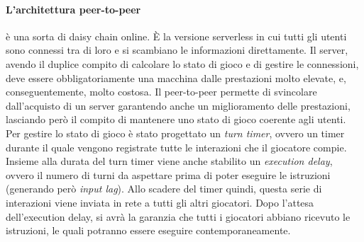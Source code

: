        \paragraph{L'architettura peer-to-peer} è una sorta di daisy chain online. È la versione serverless in cui tutti gli utenti sono connessi tra di loro e si scambiano le informazioni
            direttamente. Il server, avendo il duplice compito di calcolare lo stato di gioco e di gestire le connessioni, deve essere obbligatoriamente una macchina dalle prestazioni
            molto elevate, e, conseguentemente, molto costosa. Il peer-to-peer permette di svincolare dall'acquisto di un server garantendo anche un miglioramento delle prestazioni,
            lasciando però il compito di mantenere uno stato di gioco coerente agli utenti.\\
            Per gestire lo stato di gioco è stato progettato un \textit{turn timer}, ovvero un timer durante il quale vengono registrate tutte le interazioni che il giocatore compie.
            Insieme alla durata del turn timer viene anche stabilito un \textit{execution delay}, ovvero il numero di turni da aspettare prima di poter eseguire le istruzioni (generando
            però \textit{input lag}). Allo scadere del timer quindi, questa serie di interazioni viene inviata in rete a tutti gli altri giocatori. Dopo l'attesa dell'execution delay,
            si avrà la garanzia che tutti i giocatori abbiano ricevuto le istruzioni, le quali potranno essere eseguire contemporaneamente.\\